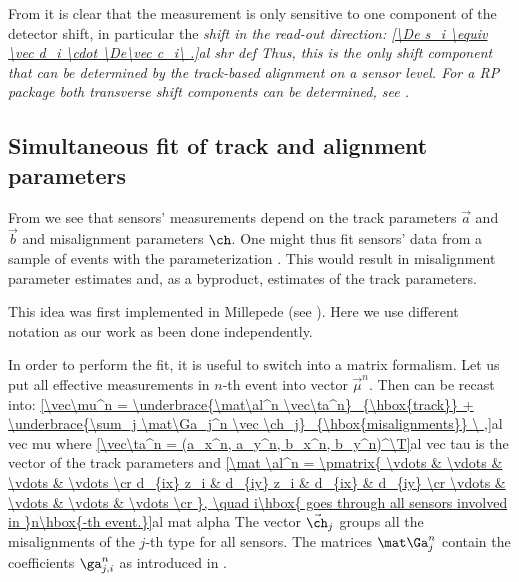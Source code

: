 
From  it is clear that the measurement is only sensitive to one component of the detector shift, in particular the \em{shift in the read-out direction}:
\eqref{\De s_i \equiv \vec d_i \cdot \De\vec c_i\ .}{al shr def}
Thus, this is the only shift component that can be determined by the track-based alignment on a sensor level. For a RP package both transverse shift components can be determined, see .


\subsection[al sim fit]{Simultaneous fit of track and alignment parameters}

From  we see that sensors' measurements depend on the track parameters $\vec a$ and $\vec b$ and misalignment parameters $\ch$. One might thus fit sensors' data from a sample of events with the parameterization . This would result in misalignment parameter estimates and, as a byproduct, estimates of the track parameters.

This idea was first implemented in Millepede (see ). Here we use different notation as our work as been done independently.

In order to perform the fit, it is useful to switch into a matrix formalism. Let us put all effective measurements in $n$-th event into vector $\vec\mu^n$. Then  can be recast into:
\eqref{\vec\mu^n =
	\underbrace{\mat\al^n \vec\ta^n}_{\hbox{track}}
	+
	\underbrace{\sum_j \mat\Ga_j^n \vec \ch_j}_{\hbox{misalignments}}
\ ,}{al vec mu}
where
\eqref{\vec\ta^n = (a_x^n, a_y^n, b_x^n, b_y^n)^\T}{al vec tau}
is the vector of the track parameters and 
\eqref{\mat \al^n = \pmatrix{
	\vdots		& \vdots		& \vdots	& \vdots \cr
	d_{ix} z_i	& d_{iy} z_i	& d_{ix}	& d_{iy} \cr
	\vdots		& \vdots		& \vdots	& \vdots \cr
}, \quad i\hbox{ goes through all sensors involved in }n\hbox{-th event.}}{al mat alpha}
The vector $\vec\ch_j$ groups all the misalignments of the $j$-th type for all sensors. The matrices $\mat\Ga_j^n$ contain the coefficients $\ga^n_{j,i}$ as introduced in .

